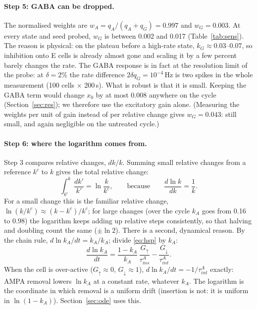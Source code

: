 \documentclass[11pt]{article}
\newcommand{\kA}{k_A}
\newcommand{\kG}{k_G}
\begin{document}
\paragraph{Step 5: GABA can be dropped.}
The normalised weights are $w_A = q_A/(q_A+q_G) = 0.997$ and $w_G = 0.003$. At every state and seed probed, $w_G$ is
between 0.002 and 0.017 (Table~\ref{tab:sens}). The reason is physical: on the plateau before a high-rate state, $\kG\approx
0.03$--$0.07$, so inhibition onto E cells is already almost gone and scaling it by a few percent barely changes the rate.
The GABA response is in fact at the resolution limit of the probe: at $\delta=2\%$ the rate difference $2\delta q_G =
10^{-4}$\,Hz is two spikes in the whole measurement (100 cells $\times$ 200\,s). What is robust is that it is small.
Keeping the GABA term would change $x_0$ by at most 0.008 anywhere on the cycle (Section~\ref{sec:res}); we therefore use
the excitatory gain alone. (Measuring the weights per unit of gain instead of per relative change gives $w_G = 0.043$:
still small, and again negligible on the untreated cycle.)

\paragraph{Step 6: where the logarithm comes from.}
Step 3 compares relative changes, $dk/k$. Summing small relative changes from a reference $k^{c}$ to $k$ gives the total
relative change:
\[
\int_{k^{c}}^{k}\frac{dk'}{k'} = \ln\frac{k}{k^{c}},\qquad\text{because}\qquad \frac{d\ln k}{dk} = \frac1k .
\]
For a small change this is the familiar relative change, $\ln(k/k^c) \approx (k-k^c)/k^c$; for large changes (over the
cycle $\kA$ goes from 0.16 to 0.98) the logarithm keeps adding up relative steps consistently, so that halving and
doubling count the same ($\pm\ln 2$). There is a second, dynamical reason. By the chain rule, $d\ln\kA/dt = \dot\kA/\kA$;
divide \eqref{eq:hsp} by $\kA$:
\[
\frac{d\ln\kA}{dt} = \frac{1-\kA}{\kA}\,\frac{G_\uparrow}{\tau^A_{ins}} - \frac{G_\downarrow}{\tau^A_{int}} .
\]
When the cell is over-active ($G_\uparrow\approx0$, $G_\downarrow\approx1$), $d\ln\kA/dt = -1/\tau^A_{int}$ exactly: AMPA
removal lowers $\ln\kA$ at a constant rate, whatever $\kA$. The logarithm is the coordinate in which removal is a uniform
drift (insertion is not: it is uniform in $\ln(1-\kA)$). Section~\ref{sec:ode} uses this.
\end{document}
